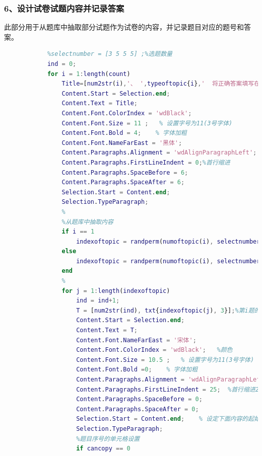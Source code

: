         \subsubsection{6、设计试卷试题内容并记录答案}
            此部分用于从题库中抽取部分试题作为试卷的内容，并记录题目对应的题号和答案。
            \begin{lstlisting}[language=Matlab]
            %%%%%%%%%%%%%%%设计试卷试题内容并记录答案%%%%%%%%%%%%%%%%%%%%%%
            %selectnumber = [3 5 5 5] ;%选题数量
            ind = 0;
            for i = 1:length(count)
                Title=[num2str(i),'、 ',typeoftopic{i},'  将正确答案填写在EXCEL工作簿中与题号对应的单元格中。'];
                Content.Start = Selection.end;
                Content.Text = Title;
                Content.Font.ColorIndex = 'wdBlack';
                Content.Font.Size = 11 ;   % 设置字号为11(3号字体)
                Content.Font.Bold = 4;    % 字体加粗
                Content.Font.NameFarEast = '黑体';
                Content.Paragraphs.Alignment = 'wdAlignParagraphLeft';
                Content.Paragraphs.FirstLineIndent = 0;%首行缩进
                Content.Paragraphs.SpaceBefore = 6;
                Content.Paragraphs.SpaceAfter = 6;
                Selection.Start = Content.end;
                Selection.TypeParagraph;
                %
                %从题库中抽取内容
                if i == 1
                    indexoftopic = randperm(numoftopic(i), selectnumber(i));%选题序号
                else
                    indexoftopic = randperm(numoftopic(i), selectnumber(i)) - 1+count(i);
                end
                %
                for j = 1:length(indexoftopic)
                    ind = ind+1;
                    T = [num2str(ind), txt{indexoftopic(j), 3}];%第i题的字符串
                    Content.Start = Selection.end;
                    Content.Text = T;
                    Content.Font.NameFarEast = '宋体';
                    Content.Font.ColorIndex = 'wdBlack';   %颜色
                    Content.Font.Size = 10.5 ;   % 设置字号为11(3号字体)
                    Content.Font.Bold =0;    % 字体加粗
                    Content.Paragraphs.Alignment = 'wdAlignParagraphLeft';    % 左端对齐
                    Content.Paragraphs.FirstLineIndent = 25;  %首行缩进25磅
                    Content.Paragraphs.SpaceBefore = 0;
                    Content.Paragraphs.SpaceAfter = 0;
                    Selection.Start = Content.end;    % 设定下面内容的起始位置
                    Selection.TypeParagraph;
                    %题目序号的单元格设置
                    if cancopy == 0

\end{lstlisting}
